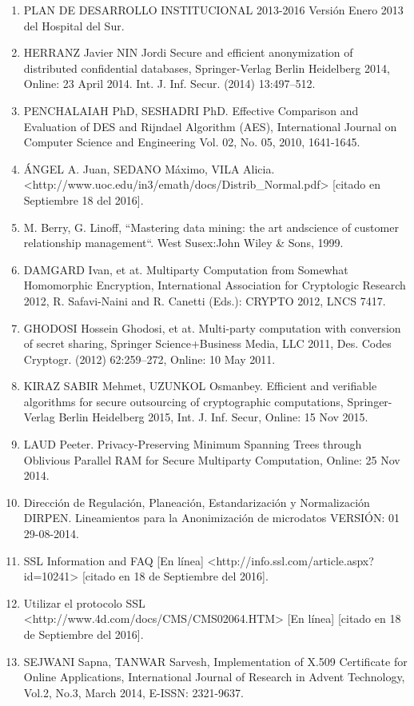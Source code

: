 \documentclass[a4paper,openright,12pt]{book}
\theoremstyle{definition}
\theoremstyle{remark}
\begin{document}
\begin{enumerate}
	\item PLAN DE DESARROLLO INSTITUCIONAL 2013-2016 Versión Enero 2013 del Hospital del Sur.
	\item HERRANZ Javier NIN Jordi Secure and efficient anonymization of distributed confidential databases, Springer-Verlag Berlin Heidelberg 2014, Online: 23 April 2014. Int. J. Inf. Secur. (2014) 13:497–512.
	\item PENCHALAIAH PhD, SESHADRI  PhD. Effective Comparison and Evaluation of DES and Rijndael Algorithm (AES), International Journal on Computer Science and Engineering Vol. 02, No. 05, 2010, 1641-1645.
    \item ÁNGEL A. Juan, SEDANO Máximo, VILA Alicia.<http://www.uoc.edu/in3/emath/docs/Distrib\_Normal.pdf> [citado en Septiembre 18 del 2016].
    \item M. Berry, G. Linoff, “Mastering data mining: the art andscience of customer relationship management“. West Susex:John Wiley \& Sons, 1999.
    \item DAMGARD Ivan, et at. Multiparty Computation from Somewhat Homomorphic Encryption, International Association for Cryptologic Research 2012, R. Safavi-Naini and R. Canetti (Eds.): CRYPTO 2012, LNCS 7417.
    \item GHODOSI Hossein Ghodosi, et at. Multi-party computation with conversion of secret sharing, Springer Science+Business Media, LLC 2011, Des. Codes Cryptogr. (2012) 62:259–272, Online: 10 May 2011.
    \item KIRAZ SABIR Mehmet, UZUNKOL Osmanbey. Efficient and verifiable algorithms for secure outsourcing of cryptographic computations, Springer-Verlag Berlin Heidelberg 2015, Int. J. Inf. Secur, Online: 15 Nov 2015.
    \item LAUD Peeter. Privacy-Preserving Minimum Spanning Trees through Oblivious Parallel RAM for Secure Multiparty Computation, Online: 25 Nov 2014.
    \item Dirección de Regulación, Planeación, Estandarización y Normalización DIRPEN. Lineamientos para la Anonimización de microdatos VERSIÓN: 01 29-08-2014.
    \item SSL Information and FAQ [En línea] <http://info.ssl.com/article.aspx?id=10241> [citado en 18 de Septiembre del 2016].
    \item Utilizar el protocolo SSL <http://www.4d.com/docs/CMS/CMS02064.HTM> [En línea] [citado en 18 de Septiembre del 2016].
    \item SEJWANI Sapna, TANWAR Sarvesh, Implementation of X.509 Certificate for Online Applications, International Journal of Research in Advent Technology, Vol.2, No.3, March 2014, E-ISSN: 2321-9637.

\end{enumerate}
\end{document}
